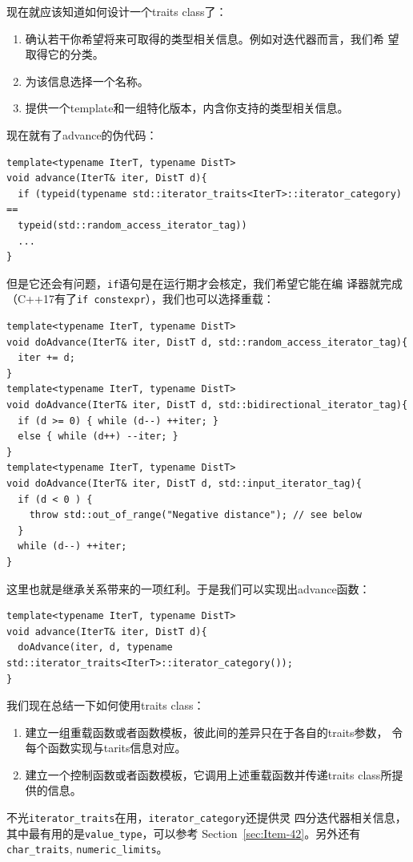现在就应该知道如何设计一个traits class了：
\begin{enumerate}
\item 确认若干你希望将来可取得的类型相关信息。例如对迭代器而言，我们希
  望取得它的分类。
\item 为该信息选择一个名称。
\item 提供一个template和一组特化版本，内含你支持的类型相关信息。
\end{enumerate}

现在就有了advance的伪代码：
\begin{verbatim}
template<typename IterT, typename DistT>
void advance(IterT& iter, DistT d){
  if (typeid(typename std::iterator_traits<IterT>::iterator_category) ==
  typeid(std::random_access_iterator_tag))
  ...
}
\end{verbatim}

但是它还会有问题，\texttt{if}语句是在运行期才会核定，我们希望它能在编
译器就完成（C++17有了\texttt{if constexpr}），我们也可以选择重载：
\begin{verbatim}
template<typename IterT, typename DistT> 
void doAdvance(IterT& iter, DistT d, std::random_access_iterator_tag){
  iter += d;
}
template<typename IterT, typename DistT>
void doAdvance(IterT& iter, DistT d, std::bidirectional_iterator_tag){
  if (d >= 0) { while (d--) ++iter; }
  else { while (d++) --iter; }
}
template<typename IterT, typename DistT>
void doAdvance(IterT& iter, DistT d, std::input_iterator_tag){
  if (d < 0 ) {
    throw std::out_of_range("Negative distance"); // see below
  }
  while (d--) ++iter;
}
\end{verbatim}
这里也就是继承关系带来的一项红利。于是我们可以实现出advance函数：
\begin{verbatim}
template<typename IterT, typename DistT>
void advance(IterT& iter, DistT d){
  doAdvance(iter, d, typename  std::iterator_traits<IterT>::iterator_category());
}
\end{verbatim}

我们现在总结一下如何使用traits class：
\begin{enumerate}
\item 建立一组重载函数或者函数模板，彼此间的差异只在于各自的traits参数，
  令每个函数实现与tarits信息对应。
\item 建立一个控制函数或者函数模板，它调用上述重载函数并传递traits
  class所提供的信息。
\end{enumerate}

不光\texttt{iterator\_traits}在用，\texttt{iterator\_category}还提供灵
四分迭代器相关信息，其中最有用的是\texttt{value\_type}，可以参考
Section~\ref{sec:Item-42}。另外还有\texttt{char\_traits},
\texttt{numeric\_limits}。

